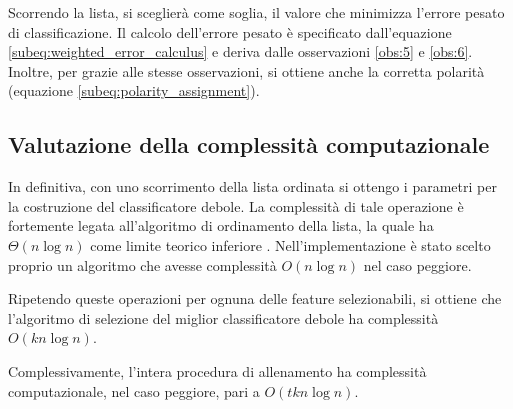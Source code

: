             Scorrendo la lista, si sceglierà come soglia, il valore che minimizza l'errore pesato di classificazione.
            Il calcolo dell'errore pesato è specificato dall'equazione \ref{subeq:weighted_error_calculus} e deriva dalle osservazioni \ref{obs:5} e \ref{obs:6}.
            Inoltre, per grazie alle stesse osservazioni, si ottiene anche la corretta polarità (equazione \ref{subeq:polarity_assignment}).

        \subsection{Valutazione della complessità computazionale}
            In definitiva, con uno scorrimento della lista ordinata si ottengo i parametri per la costruzione del classificatore debole. 
            La complessità di tale operazione è fortemente legata all'algoritmo di ordinamento della lista, la quale ha $\Theta(n\log n)$ come limite teorico inferiore \cite[p. 167]{Cormen09}.
            Nell'implementazione è stato scelto proprio un algoritmo che avesse complessità $O(n\log n)$ nel caso peggiore. 

            Ripetendo queste operazioni per ognuna delle feature selezionabili, si ottiene che l'algoritmo di selezione del miglior classificatore debole ha complessità $O(kn \log n)$.

            Complessivamente, l'intera procedura di allenamento ha complessità computazionale, nel caso peggiore, pari a $O(tkn \log n)$.
